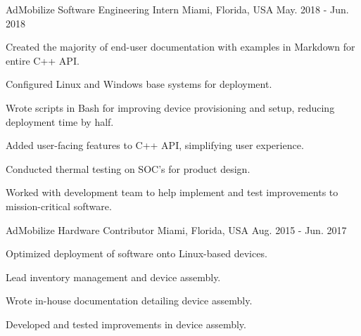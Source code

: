 \begin{cventries}

  \cventry
    {AdMobilize} %
    {Software Engineering Intern} %
    {Miami, Florida, USA} %
    {May. 2018 - Jun. 2018} %
    {
      \begin{cvitems} %
        \item {Created the majority of end-user documentation with examples  in Markdown for entire C++ API.}
        \item {Configured Linux and Windows base systems for deployment.}
        \item {Wrote scripts in Bash for improving device provisioning and setup, reducing deployment time by half.}
        \item {Added user-facing features to C++ API, simplifying user experience.}
        \item {Conducted thermal testing on SOC's for product design.}
        \item {Worked with development team to help implement and test improvements to mission-critical software.}
      \end{cvitems}
    }

  \cventry
    {AdMobilize} %
    {Hardware Contributor} %
    {Miami, Florida, USA} %
    {Aug. 2015 - Jun. 2017} %
    {
      \begin{cvitems} %
        \item {Optimized deployment of software onto Linux-based devices.}
        \item {Lead inventory management and device assembly.}
        \item {Wrote in-house documentation detailing device assembly.}
        \item {Developed and tested improvements in device assembly.}
      \end{cvitems}
    }

\end{cventries}

